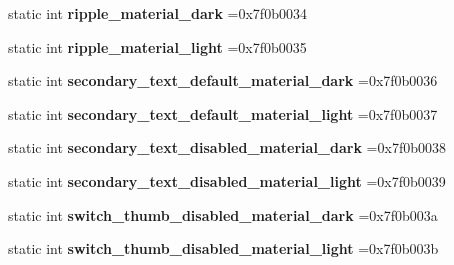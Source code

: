 \begin{DoxyCompactItemize}
\item 
\mbox{\label{classandroid_1_1support_1_1design_1_1R_1_1color_a8bd2f103458cd060724d422e35ed3dea}} 
static int {\bfseries ripple\+\_\+material\+\_\+dark} =0x7f0b0034
\item 
\mbox{\label{classandroid_1_1support_1_1design_1_1R_1_1color_a74313a73481caeb50bfd14b9a5c93739}} 
static int {\bfseries ripple\+\_\+material\+\_\+light} =0x7f0b0035
\item 
\mbox{\label{classandroid_1_1support_1_1design_1_1R_1_1color_a886a0d03ef631cdad4a956d2edc96a2d}} 
static int {\bfseries secondary\+\_\+text\+\_\+default\+\_\+material\+\_\+dark} =0x7f0b0036
\item 
\mbox{\label{classandroid_1_1support_1_1design_1_1R_1_1color_ade3a9d1f33dd63f97a45c0f6df8d8935}} 
static int {\bfseries secondary\+\_\+text\+\_\+default\+\_\+material\+\_\+light} =0x7f0b0037
\item 
\mbox{\label{classandroid_1_1support_1_1design_1_1R_1_1color_a2cc3469a34f280d815bb12eb02b4488c}} 
static int {\bfseries secondary\+\_\+text\+\_\+disabled\+\_\+material\+\_\+dark} =0x7f0b0038
\item 
\mbox{\label{classandroid_1_1support_1_1design_1_1R_1_1color_ab367d09f693bd553dc044c76994a8224}} 
static int {\bfseries secondary\+\_\+text\+\_\+disabled\+\_\+material\+\_\+light} =0x7f0b0039
\item 
\mbox{\label{classandroid_1_1support_1_1design_1_1R_1_1color_a3930d3c92648e10e5105840c003aef90}} 
static int {\bfseries switch\+\_\+thumb\+\_\+disabled\+\_\+material\+\_\+dark} =0x7f0b003a
\item 
\mbox{\label{classandroid_1_1support_1_1design_1_1R_1_1color_ad60195f524d0e28bfe3c11f04535ffc7}} 
static int {\bfseries switch\+\_\+thumb\+\_\+disabled\+\_\+material\+\_\+light} =0x7f0b003b

\end{DoxyCompactItemize}
